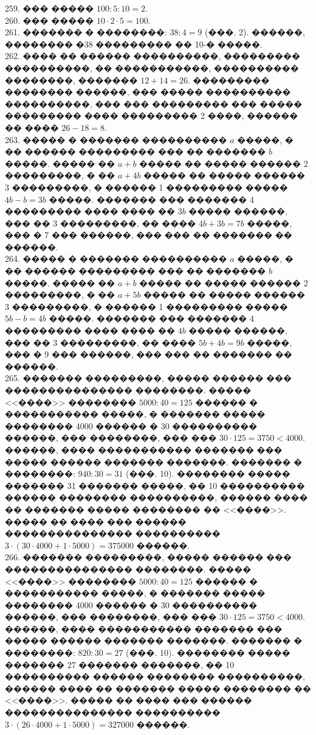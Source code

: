 \documentclass[12pt]{article}
\begin{document}
259. ��� ����� $100:5:10=2.$\\
260. ��� ����� $10\cdot2\cdot5=100.$\\
261. ������� � ��������: $38:4=9$ (���. 2). ������, �������� �38 ��������� �� 10-� �����.\\
262. ���� �� ������ ����������, ��������� ����������, �� �����������, ���������� ��������, ������� $12+14=26.$ ��������� �������� ������, ��� ����� ���������� ����������, ��� ��� ��������� ��� ����� ��������� ���� ��������� 2 ����, ������ �� ���� $26-18=8.$\\
263. ����� � ������� ���������� $a$ �����, � �� ������ ��������� ��� �� ������� $b$ �����. ����� �� $a+b$ ����� �� ����� ������ 2 ���������, � �� $a+4b$ ����� �� ����� ������ 3 ���������, � ������ 1 ��������� ����� $4b-b=3b$ �����. ������� ��� ������� 4 ��������� ���� ���� �� $3b$ ����� ������, ��� �� 3 ���������, �� ���� $4b+3b=7b$ �����, ��� � 7 ��� ������, ��� ��� �� ������� �� ������.\\
264. ����� � ������� ���������� $a$ �����, � �� ������ ��������� ��� �� ������� $b$ �����. ����� �� $a+b$ ����� �� ����� ������ 2 ���������, � �� $a+5b$ ����� �� ����� ������ 3 ���������, � ������ 1 ��������� ����� $5b-b=4b$ �����. ������� ��� ������� 4 ��������� ���� ���� �� $4b$ ����� ������, ��� �� 3 ���������, �� ���� $5b+4b=9b$ �����, ��� � 9 ��� ������, ��� ��� �� ������� �� ������.\\
265. ������� ���������, ����� ������ ��� ��������������� ��������. ����� <<����>> �������� $5000:40=125$ ������ � ����������� �����, � ������� ����� �������� 4000 ������ � 30 ���������� ������, ��� ��������, ��� ��� $30\cdot125=3750<4000.$ ������, ���� ����������� ������� ��� ����� ������ ������� �������. ������� � ��������: $940:30=31$ (���. 10). �������� ����� ������� 31 ������� �����, �� 10 ���������� ������ �������� ����������, ������ ���� �� ������� ����� �������� �� <<����>>. ����� �� ���� ��� ������ ��������������� ���������� $3\cdot(30\cdot4000+1\cdot5000)=375000$ ������.\\
266. ������� ���������, ����� ������ ��� ��������������� ��������. ����� <<����>> �������� $5000:40=125$ ������ � ����������� �����, � ������� ����� �������� 4000 ������ � 30 ���������� ������, ��� ��������, ��� ��� $30\cdot125=3750<4000.$ ������, ���� ����������� ������� ��� ����� ������ ������� �������. ������� � ��������: $820:30=27$ (���. 10). �������� ����� ������� 27 ������� �������, �� 10 ���������� ������ �������� ����������, ������ ���� �� ������� ����� �������� �� <<����>>. ����� �� ���� ��� ������ ��������������� ���������� $3\cdot(26\cdot4000+1\cdot5000)=327000$ ������.\\
\end{document}
